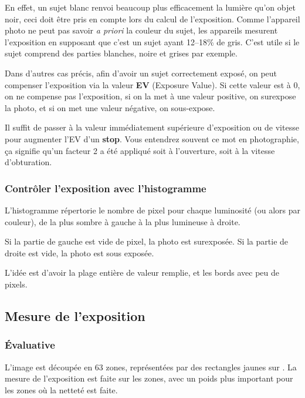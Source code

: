 \documentclass[a4paper,twoside]{article}
\begin{document}
En effet, un sujet blanc renvoi beaucoup plus efficacement la lumière qu'on objet noir, ceci doit être pris en compte lors du calcul de l'exposition. Comme l'appareil photo ne peut pas savoir \emph{a priori} la couleur du sujet, les appareils mesurent l'exposition en supposant que c'est un sujet ayant 12--18\% de gris. C'est utile si le sujet comprend des parties blanches, noire et grises par exemple. 

Dans d'autres cas précis, afin d'avoir un sujet correctement exposé, on peut compenser l'exposition via la valeur \textbf{EV} (Exposure Value). Si cette valeur est à 0, on ne compense pas l'exposition, si on la met à une valeur positive, on surexpose la photo, et si on met une valeur négative, on sous-expose. 

Il suffit de passer à la valeur immédiatement supérieure d'exposition ou de vitesse pour augmenter l'EV d'un \textbf{stop}. Vous entendrez souvent ce mot en photographie, ça signifie qu'un facteur 2 a été appliqué soit à l'ouverture, soit à la vitesse d'obturation.

\subsubsection{Contrôler l'exposition avec l'histogramme}
L'histogramme répertorie le nombre de pixel pour chaque luminosité (ou alors par couleur), de la plus sombre à gauche à la plus lumineuse à droite. 

Si la partie de gauche est vide de pixel, la photo est surexposée. Si la partie de droite est vide, la photo est sous exposée. 

L'idée est d'avoir la plage entière de valeur remplie, et les bords avec peu de pixels.

\subsection{Mesure de l'exposition}
\subsubsection{Évaluative}
L'image est découpée en 63 zones, représentées par des rectangles jaunes sur . La mesure de l'exposition est faite sur les zones, avec un poids plus important pour les zones où la netteté est faite. 
\end{document}

